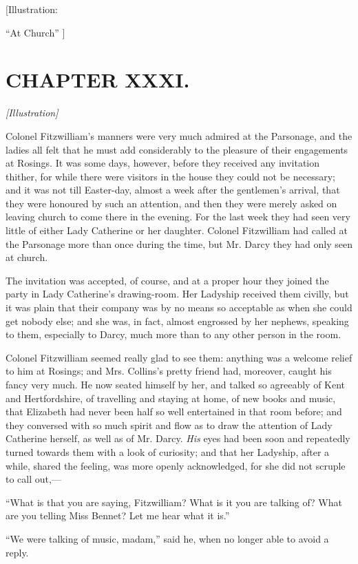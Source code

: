 \documentclass[12pt]{book}
\begin{document}
[Illustration:

``At Church'' ]

\chapter{CHAPTER XXXI.}

\emph{[Illustration]}

Colonel Fitzwilliam's manners were very much admired at the Parsonage, and the ladies all felt that he must add considerably to the pleasure of their engagements at Rosings. It was some days, however, before they received any invitation thither, for while there were visitors in the house they could not be necessary; and it was not till Easter-day, almost a week after the gentlemen's arrival, that they were honoured by such an attention, and then they were merely asked on leaving church to come there in the evening. For the last week they had seen very little of either Lady Catherine or her daughter. Colonel Fitzwilliam had called at the Parsonage more than once during the time, but Mr. Darcy they had only seen at church.

The invitation was accepted, of course, and at a proper hour they joined the party in Lady Catherine's drawing-room. Her Ladyship received them civilly, but it was plain that their company was by no means so acceptable as when she could get nobody else; and she was, in fact, almost engrossed by her nephews, speaking to them, especially to Darcy, much more than to any other person in the room.

Colonel Fitzwilliam seemed really glad to see them: anything was a welcome relief to him at Rosings; and Mrs. Collins's pretty friend had, moreover, caught his fancy very much. He now seated himself by her, and talked so agreeably of Kent and Hertfordshire, of travelling and staying at home, of new books and music, that Elizabeth had never been half so well entertained in that room before; and they conversed with so much spirit and flow as to draw the attention of Lady Catherine herself, as well as of Mr. Darcy. \textit{His} eyes had been soon and repeatedly turned towards them with a look of curiosity; and that her Ladyship, after a while, shared the feeling, was more openly acknowledged, for she did not scruple to call out,---

``What is that you are saying, Fitzwilliam? What is it you are talking of? What are you telling Miss Bennet? Let me hear what it is.''

``We were talking of music, madam,'' said he, when no longer able to avoid a reply.
\end{document}
